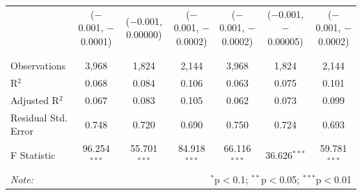 \documentclass[alpha-refs]{wiley-article-01g}
\begin{document}
\begin{landscape}
\begin{table}[!htbp]
\begin{tabular}{@{\extracolsep{5pt}}lcccccc}
			& ($-$0.001, $-$0.0001) & ($-$0.001, 0.00000) & ($-$0.001, $-$0.0002) & ($-$0.001, $-$0.0002) & ($-$0.001, $-$0.00005) & ($-$0.001, $-$0.0002) \\ 
			& & & & & & \\ 
			\hline \\[-.8ex] 
			Observations & 3,968 & 1,824 & 2,144 & 3,968 & 1,824 & 2,144 \\ 
			R$^{2}$ & 0.068 & 0.084 & 0.106 & 0.063 & 0.075 & 0.101 \\ 
			Adjusted R$^{2}$ & 0.067 & 0.083 & 0.105 & 0.062 & 0.073 & 0.099 \\ 
			Residual Std. Error & 0.748 & 0.720 & 0.690 & 0.750 & 0.724 & 0.693 \\ 
			F Statistic & 96.254$^{***}$ & 55.701$^{***}$ & 84.918$^{***}$ & 66.116$^{***}$ & 36.626$^{***}$ & 59.781$^{***}$ \\ 
			\hline 
			\textit{Note:}  & \multicolumn{6}{r}{$^{*}$p$<$0.1; $^{**}$p$<$0.05; $^{***}$p$<$0.01} \\ 
		\end{tabular} 
	\end{table} 
	
\end{landscape}

\newpage
\end{document}
